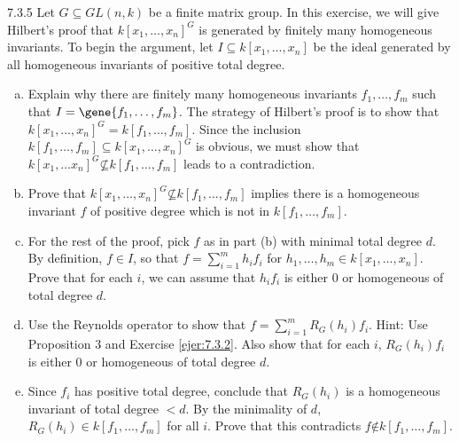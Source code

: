 \documentclass[twoside]{article}
\begin{document}
\begin{ejercicio}{7.3.5}
Let $G ⊆ GL(n, k)$ be a finite matrix group. In this exercise, we will give Hilbert’s proof
that $k[x_1, \dots , x_n]^G$ is generated by finitely many homogeneous invariants. To begin the
argument, let $I ⊆ k[x_1, \dots , x_n]$ be the ideal generated by all homogeneous invariants of
positive total degree.
\end{ejercicio}

\begin{enumerate}[a.]
\item Explain why there are finitely many homogeneous invariants $f_1, \dots , f_m$ such that
$I = 
 \gene{f_1, \dots , f_m}$. The strategy of Hilbert’s proof is to show that $k[x_1, \dots , x_n]^G =
k[ f_1, \dots , f_m]$. Since the inclusion $k[ f_1, \dots , f_m] ⊆ k[x_1, \dots , x_n]^G$ is obvious, we must
show that $k[x_1, \dots x_n]^G \not⊆ k[ f_1, \dots , f_m]$ leads to a contradiction.

\item Prove that $k[x_1, \dots , x_n]^G \not⊆ k[ f_1, \dots , f_m]$ implies there is a homogeneous invariant $f$
of positive degree which is not in $k[ f_1, \dots , f_m]$.

\item For the rest of the proof, pick $f$ as in part (b) with minimal total degree $d$. By definition, $f ∈ I$, so that $f = \sum^m_{i=1} h_i f_i$ for $h_1, \dots , h_m ∈ k[x_1, \dots , x_n]$. Prove that for each
$i$, we can assume that $h_i f_i$ is either 0 or homogeneous of total degree $d$.

\item Use the Reynolds operator to show that $f =\sum^m_{i=1} R_G(h_i) f_i$. Hint: Use Proposition 3
and Exercise \ref{ejer:7.3.2}. Also show that for each $i$, $R_G(h_i) f_i$ is either 0 or homogeneous of
total degree $d$.

\item Since $f_i$ has positive total degree, conclude that $R_G(h_i)$ is a homogeneous invariant of
total degree $< d$. By the minimality of $d$, $R_G(h_i) ∈ k[ f_1, \dots, f_m]$ for all $i$. Prove that
this contradicts $f \not∈ k[ f_1, \dots , f_m]$.
\end{enumerate}
\end{document}
